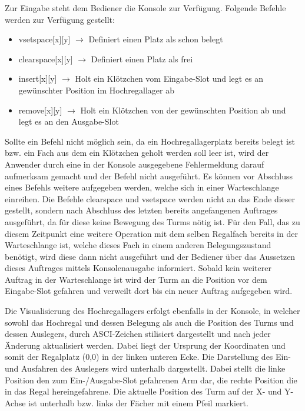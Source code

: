 Zur Eingabe steht dem Bediener die Konsole zur Verfügung.
\newline\newline
Folgende Befehle werden zur Verfügung gestellt:
\begin{itemize} 
	\item vsetspace[x][y] $\rightarrow$ Definiert einen Platz als schon belegt
	\item clearspace[x][y] $\rightarrow$ Definiert einen Platz als frei
	\item insert[x][y] $\rightarrow$ Holt ein Klötzchen vom Eingabe-Slot und legt es an gewünschter Position im Hochregallager ab
	\item remove[x][y] $\rightarrow$ Holt ein Klötzchen von der gewünschten Position ab und legt es an den Ausgabe-Slot
\end{itemize}


Sollte ein Befehl nicht möglich sein, da ein Hochregallagerplatz bereits belegt ist bzw. ein Fach aus dem ein Klötzchen geholt werden soll leer ist, wird der Anwender durch eine in der Konsole ausgegebene Fehlermeldung darauf aufmerksam gemacht und der Befehl nicht ausgeführt. Es können vor Abschluss eines Befehls weitere aufgegeben werden, welche sich in einer Warteschlange einreihen. Die Befehle \glqq{} clearspace \grqq{} und \glqq{}vsetspace\grqq{} werden nicht an das Ende dieser gestellt, sondern nach Abschluss des letzten bereits angefangenen Auftrages ausgeführt, da für diese keine Bewegung des Turms nötig ist. Für den Fall, das zu diesem Zeitpunkt eine weitere Operation mit dem selben Regalfach bereits in der Warteschlange ist, welche dieses Fach in einem anderen Belegungszustand benötigt, wird diese dann nicht ausgeführt und der Bediener über das Aussetzen dieses Auftrages mittels Konsolenausgabe informiert.
Sobald kein weiterer Auftrag in der Warteschlange ist wird der Turm an die Position vor dem Eingabe-Slot gefahren und verweilt dort bis ein neuer Auftrag aufgegeben wird.

Die Visualisierung des Hochregallagers erfolgt ebenfalls in der Konsole, in welcher sowohl das Hochregal und dessen Belegung als auch die Position des Turms und dessen Auslegers, durch ASCI-Zeichen stilisiert dargestellt und nach jeder Änderung aktualisiert werden.
Dabei liegt der Ursprung der Koordinaten und somit der Regalplatz (0,0) in der linken unteren Ecke.
Die Darstellung des Ein- und Ausfahren des Auslegers wird unterhalb dargestellt. Dabei stellt die linke Position den zum Ein-/Ausgabe-Slot gefahrenen Arm dar, die rechte Position die in das Regal hereingefahrene. Die aktuelle Position des Turm auf der X- und Y-Achse ist unterhalb bzw. links der Fächer mit einem Pfeil markiert.

